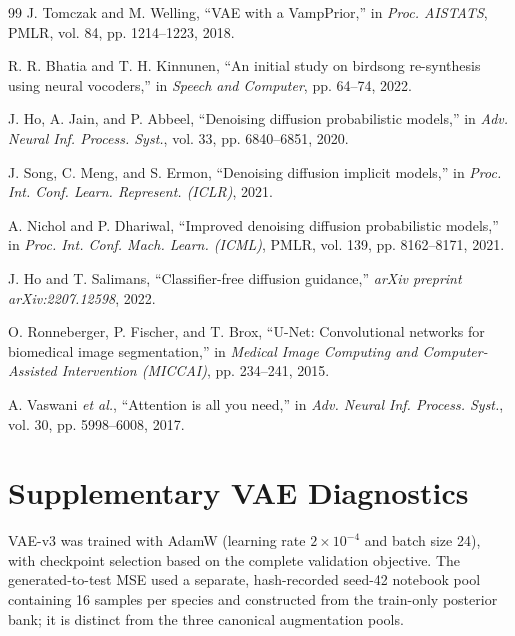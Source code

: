 \documentclass{article}
\begin{document}
\begin{thebibliography}{99}
J. Tomczak and M. Welling, ``VAE with a VampPrior,'' in \emph{Proc. AISTATS},
PMLR, vol. 84, pp. 1214--1223, 2018.

R. R. Bhatia and T. H. Kinnunen, ``An initial study on birdsong re-synthesis
using neural vocoders,'' in \emph{Speech and Computer}, pp. 64--74, 2022.

J. Ho, A. Jain, and P. Abbeel, ``Denoising diffusion probabilistic models,'' in
\emph{Adv. Neural Inf. Process. Syst.}, vol. 33, pp. 6840--6851, 2020.

J. Song, C. Meng, and S. Ermon, ``Denoising diffusion implicit models,'' in
\emph{Proc. Int. Conf. Learn. Represent. (ICLR)}, 2021.

A. Nichol and P. Dhariwal, ``Improved denoising diffusion probabilistic
models,'' in \emph{Proc. Int. Conf. Mach. Learn. (ICML)}, PMLR, vol. 139,
pp. 8162--8171, 2021.

J. Ho and T. Salimans, ``Classifier-free diffusion guidance,'' \emph{arXiv
preprint arXiv:2207.12598}, 2022.

O. Ronneberger, P. Fischer, and T. Brox, ``U-Net: Convolutional networks for
biomedical image segmentation,'' in \emph{Medical Image Computing and
Computer-Assisted Intervention (MICCAI)}, pp. 234--241, 2015.

A. Vaswani \emph{et al.}, ``Attention is all you need,'' in \emph{Adv. Neural
Inf. Process. Syst.}, vol. 30, pp. 5998--6008, 2017.

\end{thebibliography}

\clearpage
\appendix
\section{Supplementary VAE Diagnostics}

VAE-v3 was trained with AdamW (learning rate $2\times10^{-4}$ and batch size
24), with checkpoint selection based on the complete validation objective. The
generated-to-test MSE used a separate, hash-recorded seed-42 notebook pool
containing 16 samples per species and constructed from the train-only posterior
bank; it is distinct from the three canonical augmentation pools.
\end{document}
